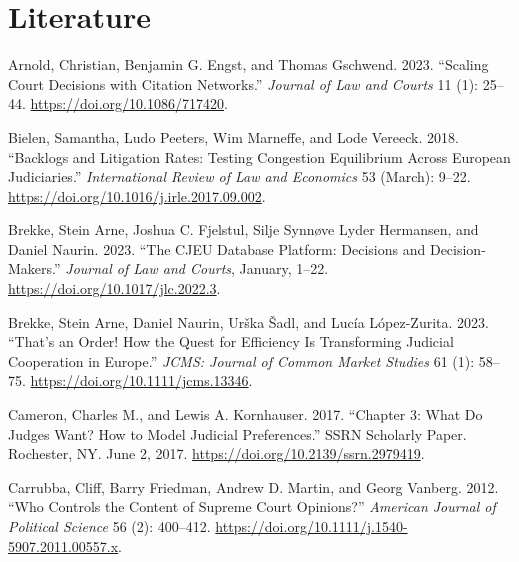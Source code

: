 \documentclass[
  11pt,
]{article}
\newlength{\cslhangindent}
\newenvironment{CSLReferences}[2] %
 {%
  \setlength{\parindent}{0pt}
  \ifodd #1 \everypar{\setlength{\hangindent}{\cslhangindent}}\ignorespaces\fi
  \ifnum #2 > 0
  \setlength{\parskip}{#2\baselineskip}
  \fi
 }%
 {}
\begin{document}
\hypertarget{literature}{%
\section*{Literature}\label{literature}}

\hypertarget{refs}{}
\begin{CSLReferences}{1}{0}
\leavevmode{}%
Arnold, Christian, Benjamin G. Engst, and Thomas Gschwend. 2023.
{``Scaling {Court Decisions} with {Citation Networks}.''} \emph{Journal
of Law and Courts} 11 (1): 25--44. \url{https://doi.org/10.1086/717420}.

\leavevmode{}%
Bielen, Samantha, Ludo Peeters, Wim Marneffe, and Lode Vereeck. 2018.
{``Backlogs and Litigation Rates: {Testing} Congestion Equilibrium
Across {European} Judiciaries.''} \emph{International Review of Law and
Economics} 53 (March): 9--22.
\url{https://doi.org/10.1016/j.irle.2017.09.002}.

\leavevmode{}%
Brekke, Stein Arne, Joshua C. Fjelstul, Silje Synnøve Lyder Hermansen,
and Daniel Naurin. 2023. {``The {CJEU Database Platform}: {Decisions}
and {Decision-Makers}.''} \emph{Journal of Law and Courts}, January,
1--22. \url{https://doi.org/10.1017/jlc.2022.3}.

\leavevmode{}%
Brekke, Stein Arne, Daniel Naurin, Urška Šadl, and Lucía López-Zurita.
2023. {``That's an {Order}! {How} the {Quest} for {Efficiency Is
Transforming Judicial Cooperation} in {Europe}.''} \emph{JCMS: Journal
of Common Market Studies} 61 (1): 58--75.
\url{https://doi.org/10.1111/jcms.13346}.

\leavevmode{}%
Cameron, Charles M., and Lewis A. Kornhauser. 2017. {``Chapter 3: {What
Do Judges Want}? {How} to {Model Judicial Preferences}.''} SSRN
Scholarly Paper. {Rochester, NY}. June 2, 2017.
\url{https://doi.org/10.2139/ssrn.2979419}.

\leavevmode{}%
Carrubba, Cliff, Barry Friedman, Andrew D. Martin, and Georg Vanberg.
2012. {``Who {Controls} the {Content} of {Supreme Court Opinions}?''}
\emph{American Journal of Political Science} 56 (2): 400--412.
\url{https://doi.org/10.1111/j.1540-5907.2011.00557.x}.


\end{CSLReferences}
\end{document}
